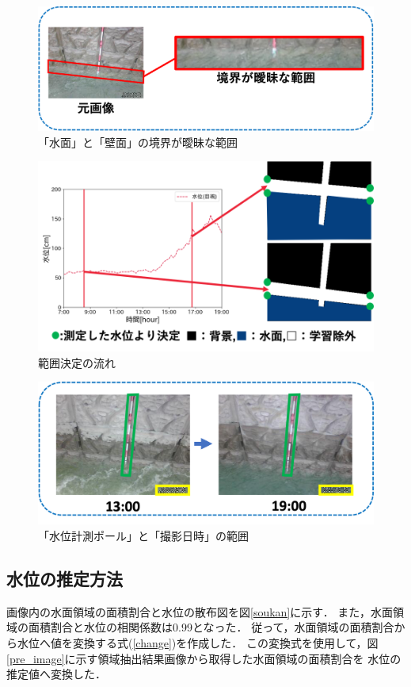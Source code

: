 \begin{figure}[ht]
  \centering
  \includegraphics[keepaspectratio,width=0.9\linewidth]{image/aimai.png}
  \caption{「水面」と「壁面」の境界が曖昧な範囲}
  \label{aimai}
\end{figure}

\begin{figure}[ht]
  \centering
  \includegraphics[keepaspectratio,width=0.8\linewidth]{image/ano2.png}
  \caption{範囲決定の流れ}
  \label{ano2}
\end{figure}

\begin{figure}[t]
  \centering
  \includegraphics[keepaspectratio,width=0.9\linewidth]{image/day_pole.png}
  \caption{「水位計測ポール」と「撮影日時」の範囲}
  \label{day_pole}
\end{figure}

\clearpage


\subsection{水位の推定方法}
\label{4.3}
画像内の水面領域の面積割合と水位の散布図を図\ref{soukan}に示す．
また，水面領域の面積割合と水位の相関係数は0.99となった．
従って，水面領域の面積割合から水位へ値を変換する式(\ref{change})を作成した．
この変換式を使用して，図\ref{pre_image}に示す領域抽出結果画像から取得した水面領域の面積割合を
水位の推定値へ変換した．

